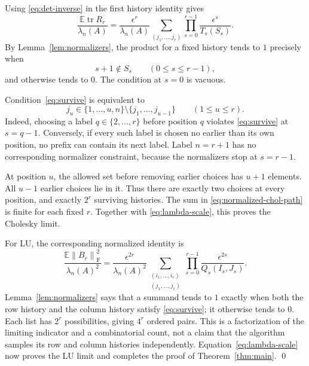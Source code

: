 \documentclass[11pt]{article}
\theoremstyle{remark}
\DeclareMathOperator{\tr}{tr}
\newcommand{\E}{\mathbb E}
\newcommand{\F}{\mathrm F}
\newcommand{\eps}{\epsilon}
\newcommand{\norm}[1]{\left\lVert#1\right\rVert}
\begin{document}
Using \eqref{eq:det-inverse} in the first history identity gives
\begin{equation}\label{eq:normalized-chol-path}
 \frac{\E\tr R_r}{\lambda_n(A)}
 =\frac{\eps^r}{\lambda_n(A)}
 \sum_{(j_1,\ldots,j_r)}\prod_{s=0}^{r-1}
       \frac{\eps^s}{T_s(S_s)}.
\end{equation}
By Lemma~\ref{lem:normalizers}, the product for a fixed history tends to $1$
precisely when
\begin{equation}\label{eq:survive}
 s+1\notin S_s\qquad(0\le s\le r-1),
\end{equation}
and otherwise tends to $0$. The condition at $s=0$ is vacuous.

Condition~\eqref{eq:survive} is equivalent to
\begin{equation}\label{eq:twochoices}
 j_u\in\{1,\ldots,u,n\}\setminus\{j_1,\ldots,j_{u-1}\}
 \qquad(1\le u\le r).
\end{equation}
Indeed, choosing a label $q\in\{2,\ldots,r\}$ before position $q$ violates
\eqref{eq:survive} at $s=q-1$. Conversely, if every such label is chosen no
earlier than its own position, no prefix can contain its next label. Label
$n=r+1$ has no corresponding normalizer constraint, because the normalizers
stop at $s=r-1$.

At position $u$, the allowed set before removing earlier choices has $u+1$
elements. All $u-1$ earlier choices lie in it. Thus there are exactly two
choices at every position, and exactly $2^r$ surviving histories.
The sum in \eqref{eq:normalized-chol-path} is finite for each fixed $r$.
Together with \eqref{eq:lambda-scale}, this proves the Cholesky limit.

For LU, the corresponding normalized identity is
\begin{equation}\label{eq:normalized-lu-path}
 \frac{\E\norm{B_r}_{\F}^2}{\lambda_n(A)^2}
 =\frac{\eps^{2r}}{\lambda_n(A)^2}
 \sum_{\substack{(i_1,\ldots,i_r)\\(j_1,\ldots,j_r)}}
 \prod_{s=0}^{r-1}\frac{\eps^{2s}}{Q_s(I_s,J_s)}.
\end{equation}
Lemma~\ref{lem:normalizers} says that a summand tends to $1$ exactly when
both the row history and the column history satisfy \eqref{eq:survive}; it
otherwise tends to $0$. Each list has $2^r$ possibilities, giving $4^r$
ordered pairs. This is a factorization of the limiting indicator and a
combinatorial count, not a claim that the algorithm samples its row and column
histories independently. Equation~\eqref{eq:lambda-scale} now proves the LU
limit and completes the proof of Theorem~\ref{thm:main}.
\qed
\end{document}
